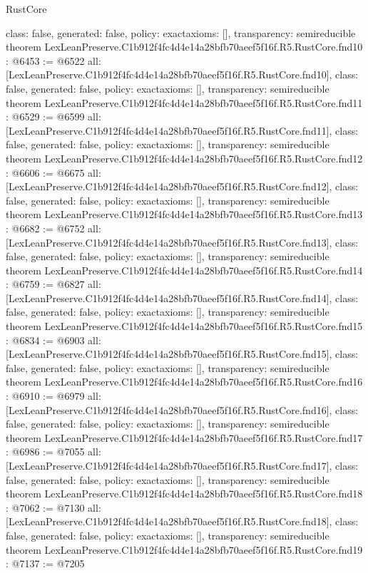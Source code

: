 \begin{lexlean}{RustCore}
\begin{coremodule}
{  class: false,
  generated: false,
  policy: exact{axioms: []},
  transparency: semireducible
}
theorem LexLeanPreserve.C1b912f4fc4d4e14a28bfb70aeef5f16f.R5.RustCore.fnd10 : @6453 := @6522 {
  all: [LexLeanPreserve.C1b912f4fc4d4e14a28bfb70aeef5f16f.R5.RustCore.fnd10],
  class: false,
  generated: false,
  policy: exact{axioms: []},
  transparency: semireducible
}
theorem LexLeanPreserve.C1b912f4fc4d4e14a28bfb70aeef5f16f.R5.RustCore.fnd11 : @6529 := @6599 {
  all: [LexLeanPreserve.C1b912f4fc4d4e14a28bfb70aeef5f16f.R5.RustCore.fnd11],
  class: false,
  generated: false,
  policy: exact{axioms: []},
  transparency: semireducible
}
theorem LexLeanPreserve.C1b912f4fc4d4e14a28bfb70aeef5f16f.R5.RustCore.fnd12 : @6606 := @6675 {
  all: [LexLeanPreserve.C1b912f4fc4d4e14a28bfb70aeef5f16f.R5.RustCore.fnd12],
  class: false,
  generated: false,
  policy: exact{axioms: []},
  transparency: semireducible
}
theorem LexLeanPreserve.C1b912f4fc4d4e14a28bfb70aeef5f16f.R5.RustCore.fnd13 : @6682 := @6752 {
  all: [LexLeanPreserve.C1b912f4fc4d4e14a28bfb70aeef5f16f.R5.RustCore.fnd13],
  class: false,
  generated: false,
  policy: exact{axioms: []},
  transparency: semireducible
}
theorem LexLeanPreserve.C1b912f4fc4d4e14a28bfb70aeef5f16f.R5.RustCore.fnd14 : @6759 := @6827 {
  all: [LexLeanPreserve.C1b912f4fc4d4e14a28bfb70aeef5f16f.R5.RustCore.fnd14],
  class: false,
  generated: false,
  policy: exact{axioms: []},
  transparency: semireducible
}
theorem LexLeanPreserve.C1b912f4fc4d4e14a28bfb70aeef5f16f.R5.RustCore.fnd15 : @6834 := @6903 {
  all: [LexLeanPreserve.C1b912f4fc4d4e14a28bfb70aeef5f16f.R5.RustCore.fnd15],
  class: false,
  generated: false,
  policy: exact{axioms: []},
  transparency: semireducible
}
theorem LexLeanPreserve.C1b912f4fc4d4e14a28bfb70aeef5f16f.R5.RustCore.fnd16 : @6910 := @6979 {
  all: [LexLeanPreserve.C1b912f4fc4d4e14a28bfb70aeef5f16f.R5.RustCore.fnd16],
  class: false,
  generated: false,
  policy: exact{axioms: []},
  transparency: semireducible
}
theorem LexLeanPreserve.C1b912f4fc4d4e14a28bfb70aeef5f16f.R5.RustCore.fnd17 : @6986 := @7055 {
  all: [LexLeanPreserve.C1b912f4fc4d4e14a28bfb70aeef5f16f.R5.RustCore.fnd17],
  class: false,
  generated: false,
  policy: exact{axioms: []},
  transparency: semireducible
}
theorem LexLeanPreserve.C1b912f4fc4d4e14a28bfb70aeef5f16f.R5.RustCore.fnd18 : @7062 := @7130 {
  all: [LexLeanPreserve.C1b912f4fc4d4e14a28bfb70aeef5f16f.R5.RustCore.fnd18],
  class: false,
  generated: false,
  policy: exact{axioms: []},
  transparency: semireducible
}
theorem LexLeanPreserve.C1b912f4fc4d4e14a28bfb70aeef5f16f.R5.RustCore.fnd19 : @7137 := @7205 {
}
\end{coremodule}
\end{lexlean}
